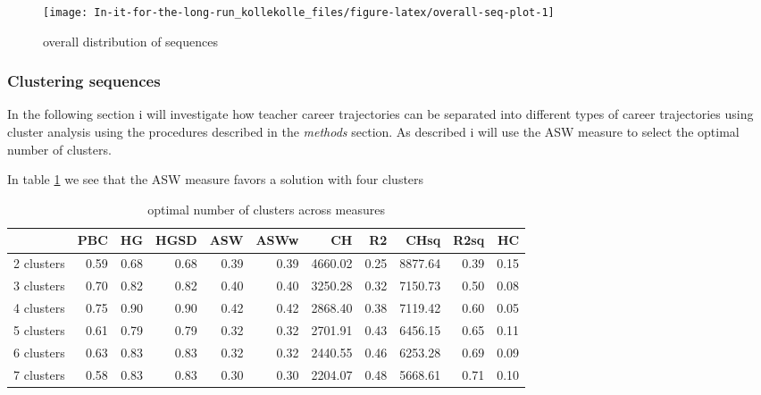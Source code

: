 \documentclass[
]{article}
\begin{document}
\begin{figure}[H]
\texttt{[image: In-it-for-the-long-run\_kollekolle\_files/figure-latex/overall-seq-plot-1]} \caption{overall distribution of sequences}\label{fig:overall-seq-plot}
\end{figure}

\hypertarget{clustering-sequences}{%
\subsubsection{Clustering sequences}\label{clustering-sequences}}

In the following section i will investigate how teacher career trajectories can be separated into different types of career trajectories using cluster analysis using the procedures described in the \emph{methods} section. As described i will use the ASW measure to select the optimal number of clusters.

In table \ref{tab:cluster-choice} we see that the ASW measure favors a solution with four clusters

\begin{table}[!h]
\centering
\caption{\label{tab:cluster-choice}optimal number of clusters across measures}
\centering
\begin{tabular}[t]{l|r|r|r|r|r|r|r|r|r|r}
\hline
  & PBC & HG & HGSD & ASW & ASWw & CH & R2 & CHsq & R2sq & HC\\
\hline
2 clusters & 0.59 & 0.68 & 0.68 & 0.39 & 0.39 & 4660.02 & 0.25 & 8877.64 & 0.39 & 0.15\\
\hline
3 clusters & 0.70 & 0.82 & 0.82 & 0.40 & 0.40 & 3250.28 & 0.32 & 7150.73 & 0.50 & 0.08\\
\hline
4 clusters & 0.75 & 0.90 & 0.90 & 0.42 & 0.42 & 2868.40 & 0.38 & 7119.42 & 0.60 & 0.05\\
\hline
5 clusters & 0.61 & 0.79 & 0.79 & 0.32 & 0.32 & 2701.91 & 0.43 & 6456.15 & 0.65 & 0.11\\
\hline
6 clusters & 0.63 & 0.83 & 0.83 & 0.32 & 0.32 & 2440.55 & 0.46 & 6253.28 & 0.69 & 0.09\\
\hline
7 clusters & 0.58 & 0.83 & 0.83 & 0.30 & 0.30 & 2204.07 & 0.48 & 5668.61 & 0.71 & 0.10\\
\hline
\end{tabular}
\end{table}
\end{document}
